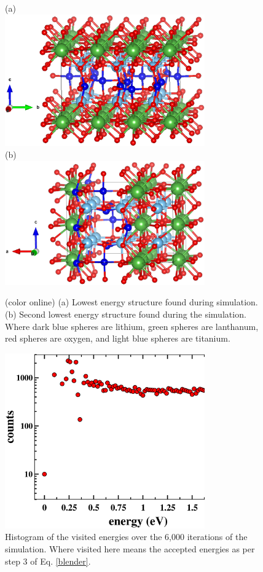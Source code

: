\documentclass[aps,pre,reprint,superscriptaddress,showkeys]{revtex4-1}
\begin{document}
\begin{figure}
(a)\\
\includegraphics[width=8.6cm]{fig10a.eps}\\
(b)\\
\includegraphics[width=8.6cm]{fig10b.eps}
\caption{(color online) (a) Lowest energy structure found during simulation. (b) Second lowest energy structure found during the simulation. Where dark blue spheres are lithium, green spheres are lanthanum, red spheres are oxygen, and light blue spheres  are titanium. \label{lowen_structures}}
\end{figure}

\begin{figure}
\includegraphics[width=8.6cm]{fig11.eps}
\caption{Histogram of the visited energies over the 6,000 iterations of the simulation. Where visited here means the accepted energies as per step 3 of Eq. \ref{blender}.\label{Htot}}
\end{figure}
\end{document}
